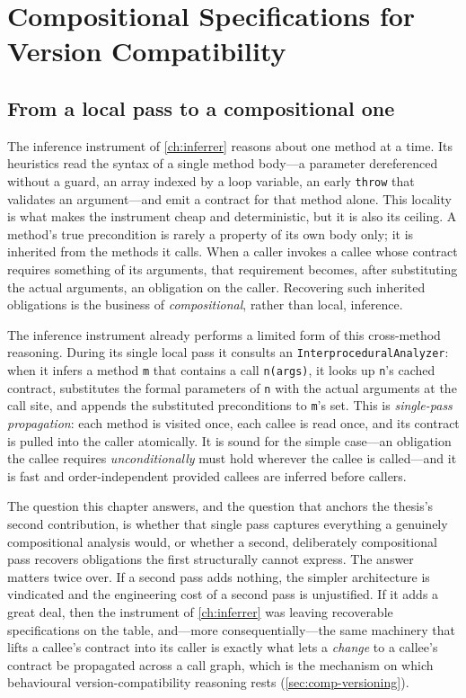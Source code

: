 \chapter{Compositional Specifications for Version Compatibility}\label{ch:compositional}

\section{From a local pass to a compositional one}
\label{sec:comp-motivation}

The inference instrument of \cref{ch:inferrer} reasons about one method at a
time. Its heuristics read the syntax of a single method body---a parameter
dereferenced without a guard, an array indexed by a loop variable, an early
\texttt{throw} that validates an argument---and emit a contract for that method
alone. This locality is what makes the instrument cheap and deterministic, but
it is also its ceiling. A method's true precondition is rarely a property of its
own body only; it is inherited from the methods it calls. When a caller invokes
a callee whose contract requires something of its arguments, that requirement
becomes, after substituting the actual arguments, an obligation on the caller.
Recovering such inherited obligations is the business of \emph{compositional},
rather than local, inference.

The inference instrument already performs a limited form of this cross-method
reasoning. During its single local pass it consults an
\texttt{InterproceduralAnalyzer}: when it infers a method \texttt{m} that
contains a call \texttt{n(args)}, it looks up \texttt{n}'s cached contract,
substitutes the formal parameters of \texttt{n} with the actual arguments at the
call site, and appends the substituted preconditions to \texttt{m}'s set. This
is \emph{single-pass propagation}: each method is visited once, each callee is
read once, and its contract is pulled into the caller atomically. It is sound
for the simple case---an obligation the callee requires \emph{unconditionally}
must hold wherever the callee is called---and it is fast and order-independent
provided callees are inferred before callers.

The question this chapter answers, and the question that anchors the thesis's
second contribution, is whether that single pass captures everything a genuinely
compositional analysis would, or whether a second, deliberately compositional
pass recovers obligations the first structurally cannot express. The answer
matters twice over. If a second pass adds nothing, the simpler architecture is
vindicated and the engineering cost of a second pass is unjustified. If it adds
a great deal, then the instrument of \cref{ch:inferrer} was leaving recoverable
specifications on the table, and---more consequentially---the same machinery
that lifts a callee's contract into its caller is exactly what lets a
\emph{change} to a callee's contract be propagated across a call graph, which is
the mechanism on which behavioural version-compatibility reasoning rests
(\cref{sec:comp-versioning}).

